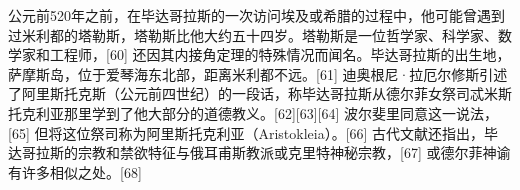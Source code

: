 公元前520年之前，在毕达哥拉斯的一次访问埃及或希腊的过程中，他可能曾遇到过米利都的塔勒斯，塔勒斯比他大约五十四岁。塔勒斯是一位哲学家、科学家、数学家和工程师，[60] 还因其内接角定理的特殊情况而闻名。毕达哥拉斯的出生地，萨摩斯岛，位于爱琴海东北部，距离米利都不远。[61] 迪奥根尼·拉厄尔修斯引述了阿里斯托克斯（公元前四世纪）的一段话，称毕达哥拉斯从德尔菲女祭司忒米斯托克利亚那里学到了他大部分的道德教义。[62][63][64] 波尔斐里同意这一说法，[65] 但将这位祭司称为阿里斯托克利亚（Aristokleia）。[66] 古代文献还指出，毕达哥拉斯的宗教和禁欲特征与俄耳甫斯教派或克里特神秘宗教，[67] 或德尔菲神谕有许多相似之处。[68]
